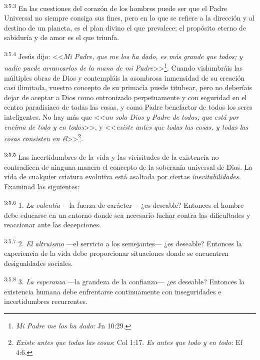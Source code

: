 \par
\textsuperscript{3:5.3} En las cuestiones del corazón de los hombres puede ser que el Padre Universal no siempre consiga sus fines, pero en lo que se refiere a la dirección y al destino de un planeta, es el plan divino el que prevalece; el propósito eterno de sabiduría y de amor es el que triunfa.

\par
\textsuperscript{3:5.4} Jesús dijo: <<\textit{Mi Padre, que me los ha dado, es más grande que todos; y nadie puede arrancarlos de la mano de mi Padre}>>\footnote{\textit{Mi Padre me los ha dado}: Jn 10:29.}. Cuando vislumbráis las múltiples obras de Dios y contempláis la asombrosa inmensidad de su creación casi ilimitada, vuestro concepto de su primacía puede titubear, pero no deberíais dejar de aceptar a Dios como entronizado perpetuamente y con seguridad en el centro paradisiaco de todas las cosas, y como Padre benefactor de todos los seres inteligentes. No hay más que <<\textit{un solo Dios y Padre de todos, que está por encima de todo y en todos}>>, y <<\textit{existe antes que todas las cosas, y todas las cosas consisten en él}>>\footnote{\textit{Existe antes que todas las cosas}: Col 1:17. \textit{Es antes que todo y en todo}: Ef 4:6.}.

\par
\textsuperscript{3:5.5} Las incertidumbres de la vida y las vicisitudes de la existencia no contradicen de ninguna manera el concepto de la soberanía universal de Dios. La vida de cualquier criatura evolutiva está asaltada por ciertas \textit{inevitabilidades.} Examinad las siguientes:

\par
\textsuperscript{3:5.6} 1. \textit{La valentía} ---la fuerza de carácter--- ¿es deseable? Entonces el hombre debe educarse en un entorno donde sea necesario luchar contra las dificultades y reaccionar ante las decepciones.

\par
\textsuperscript{3:5.7} 2. \textit{El altruismo} ---el servicio a los semejantes--- ¿es deseable? Entonces la experiencia de la vida debe proporcionar situaciones donde se encuentren desigualdades sociales.

\par
\textsuperscript{3:5.8} 3. \textit{La esperanza} ---la grandeza de la confianza--- ¿es deseable? Entonces la existencia humana debe enfrentarse continuamente con inseguridades e incertidumbres recurrentes.

